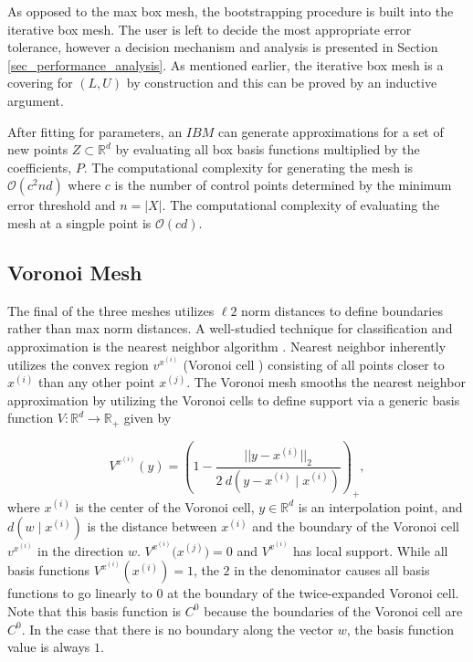 As opposed to the max box mesh, the bootstrapping procedure is built into the iterative box mesh. The user is left to decide the most appropriate error tolerance, however a decision mechanism and analysis is presented in Section \ref{sec_performance_analysis}. As mentioned earlier, the iterative box mesh is a covering for $(L,U)$ by construction and this can be proved by an inductive argument.

After fitting for parameters, an $IBM$ can generate approximations for a set of new points $Z \subset \mathbb{R}^d$ by evaluating all box basis functions multiplied by the coefficients, $P$. The computational complexity for generating the mesh is $\mathcal{O}(c^2 n d)$ where $c$ is the number of control points determined by the minimum error threshold and $n = |X|$. The computational complexity of evaluating the mesh at a singple point is $\mathcal{O}(c d)$.

\subsection{Voronoi Mesh}

The final of the three meshes utilizes $\ell2$ norm distances to define boundaries rather than max norm distances. A well-studied technique for classification and approximation is the nearest neighbor algorithm \cite{cover1967nearest}. Nearest neighbor inherently utilizes the convex region $v^{x^{(i)}}$ (Voronoi cell \cite{dirichlet1850reduction}) consisting of all points closer to $x^{(i)}$ than any other point $x^{(j)}$. The Voronoi mesh smooths the nearest neighbor approximation by utilizing the Voronoi cells to define support via a generic basis function $V: \mathbb{R}^d \rightarrow \mathbb{R}_+$ given by

$$ V^{x^{(i)}}(y) = \left(1 - \frac{||y - x^{(i)}||_2}{2 \ d(y - x^{(i)} \mid x^{(i)})} \right)_+, $$
where $x^{(i)}$ is the center of the Voronoi cell, $y \in \mathbb{R}^d$ is an interpolation point, and $d(w \mid x^{(i)})$ is the distance between $x^{(i)}$ and the boundary of the Voronoi cell $v^{x^{(i)}}$ in the direction $w$. $V^{x^{(i)}}\bigl(x^{(j)}\bigr) = 0$ and $V^{x^{(i)}}$ has local support. While all basis functions $V^{x^{(i)}}(x^{(i)}) = 1$, the $2$ in the denominator causes all basis functions to go linearly to $0$ at the boundary of the twice-expanded Voronoi cell. Note that this basis function is $C^0$ because the boundaries of the Voronoi cell are $C^0$. In the case that there is no boundary along the vector $w$, the basis function value is always $1$.

